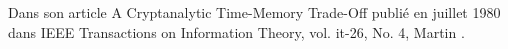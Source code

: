 Dans son article \og{}A Cryptanalytic Time-Memory Trade-Off\fg{}\cite{ehellman} publié en juillet 1980 dans \og{}IEEE Transactions on Information Theory\fg{}, vol. it-26, No. 4, Martin .

\endinput{}
